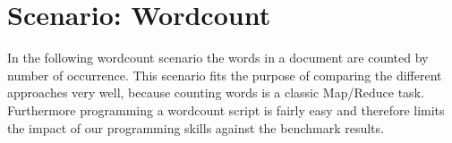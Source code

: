 \section{Scenario: Wordcount}

In the following wordcount scenario the words in a document are counted by number of occurrence. This scenario fits the purpose of comparing the different approaches very well, because counting words is a classic Map/Reduce task. Furthermore programming a wordcount script is fairly easy and therefore limits the impact of our programming skills against the benchmark results.